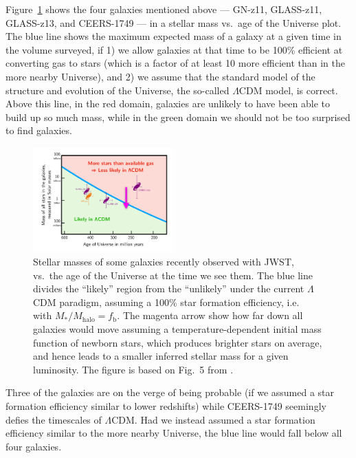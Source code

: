 \documentclass[useAMS,usenatbib,bibyear]{aa}
\begin{document}
Figure~\ref{fig:jwst} shows the four galaxies mentioned above --- GN-z11, GLASS-z11, GLASS-z13, and CEERS-1749 --- in a stellar mass vs.~age of the Universe plot. The blue line shows the maximum expected mass of a galaxy at a given time in the volume surveyed, if 1) we allow galaxies at that time to be 100\% efficient at converting gas to stars (which is a factor of at least 10 more efficient than in the more nearby Universe), and 2) we assume that the standard model of the structure and evolution of the Universe, the so-called $\Lambda$CDM model, is correct.
Above this line, in the red domain, galaxies are unlikely to have been able to build up so much mass, while in the green domain we should not be too surprised to find galaxies.
\begin{figure}[!t]
    \centering
    \includegraphics [width=0.48\textwidth] {jwst.pdf}
    \caption{Stellar masses of some galaxies recently observed with JWST, vs.~the age of the Universe at the time we see them.
    The blue line divides the ``likely'' region from the ``unlikely'' under the current $\Lambda$CDM paradigm, assuming a 100\% star formation efficiency, i.e.~ with $M_*/M_\mathrm{halo} = f_\mathrm{b}$.
    The magenta arrow show how far down all galaxies would move assuming a temperature-dependent initial mass function of newborn stars, which produces brighter stars on average, and hence leads to a smaller inferred stellar mass for a given luminosity.
    The figure is based on Fig.~5 from \citet{Naidu2022b}.}
    \label{fig:jwst}
\end{figure}
Three of the galaxies are on the verge of being probable (if we assumed a star formation efficiency similar to lower redshifts) while CEERS-1749 seemingly defies the timescales of $\Lambda$CDM.
Had we instead assumed a star formation efficiency similar to the more nearby Universe, the blue line would fall below all four galaxies.
\end{document}

